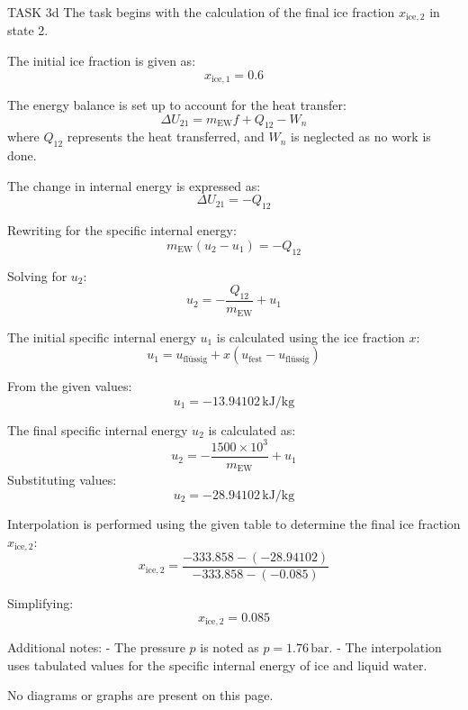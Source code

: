 TASK 3d  
The task begins with the calculation of the final ice fraction \( x_{\text{ice},2} \) in state 2.  

The initial ice fraction is given as:  
\[
x_{\text{ice},1} = 0.6
\]

The energy balance is set up to account for the heat transfer:  
\[
\Delta U_{21} = m_{\text{EW}} f + Q_{12} - W_n
\]  
where \( Q_{12} \) represents the heat transferred, and \( W_n \) is neglected as no work is done.  

The change in internal energy is expressed as:  
\[
\Delta U_{21} = -Q_{12}
\]  

Rewriting for the specific internal energy:  
\[
m_{\text{EW}} (u_2 - u_1) = -Q_{12}
\]  

Solving for \( u_2 \):  
\[
u_2 = -\frac{Q_{12}}{m_{\text{EW}}} + u_1
\]  

The initial specific internal energy \( u_1 \) is calculated using the ice fraction \( x \):  
\[
u_1 = u_{\text{flüssig}} + x (u_{\text{fest}} - u_{\text{flüssig}})
\]  

From the given values:  
\[
u_1 = -13.94102 \, \text{kJ/kg}
\]  

The final specific internal energy \( u_2 \) is calculated as:  
\[
u_2 = -\frac{1500 \times 10^3}{m_{\text{EW}}} + u_1
\]  
Substituting values:  
\[
u_2 = -28.94102 \, \text{kJ/kg}
\]  

Interpolation is performed using the given table to determine the final ice fraction \( x_{\text{ice},2} \):  
\[
x_{\text{ice},2} = \frac{-333.858 - (-28.94102)}{-333.858 - (-0.085)}
\]  

Simplifying:  
\[
x_{\text{ice},2} = 0.085
\]  

Additional notes:  
- The pressure \( p \) is noted as \( p = 1.76 \, \text{bar} \).  
- The interpolation uses tabulated values for the specific internal energy of ice and liquid water.  

No diagrams or graphs are present on this page.
